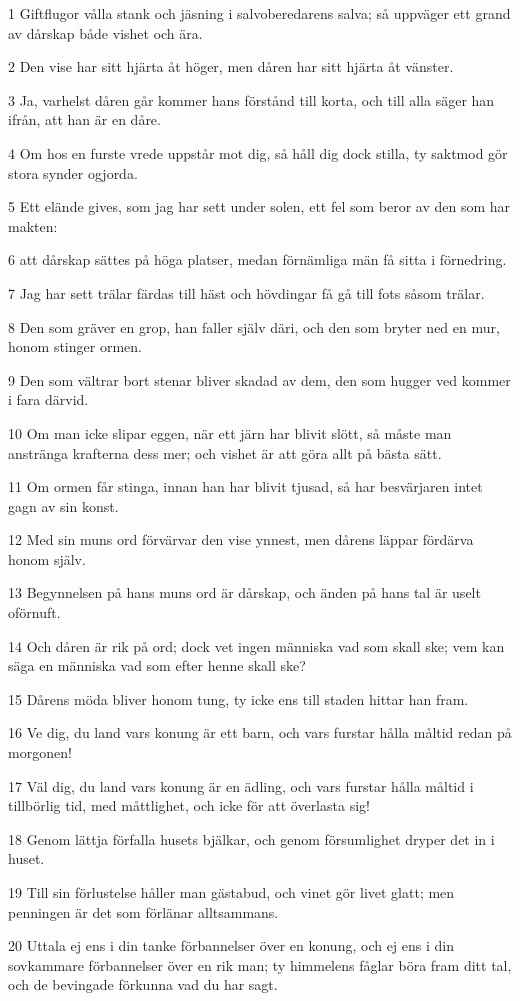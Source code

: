 \par 1 Giftflugor vålla stank och jäsning i salvoberedarens salva; så uppväger ett grand av dårskap både vishet och ära.
\par 2 Den vise har sitt hjärta åt höger, men dåren har sitt hjärta åt vänster.
\par 3 Ja, varhelst dåren går kommer hans förstånd till korta, och till alla säger han ifrån, att han är en dåre.
\par 4 Om hos en furste vrede uppstår mot dig, så håll dig dock stilla, ty saktmod gör stora synder ogjorda.
\par 5 Ett elände gives, som jag har sett under solen, ett fel som beror av den som har makten:
\par 6 att dårskap sättes på höga platser, medan förnämliga män få sitta i förnedring.
\par 7 Jag har sett trälar färdas till häst och hövdingar få gå till fots såsom trälar.
\par 8 Den som gräver en grop, han faller själv däri, och den som bryter ned en mur, honom stinger ormen.
\par 9 Den som vältrar bort stenar bliver skadad av dem, den som hugger ved kommer i fara därvid.
\par 10 Om man icke slipar eggen, när ett järn har blivit slött, så måste man anstränga krafterna dess mer; och vishet är att göra allt på bästa sätt.
\par 11 Om ormen får stinga, innan han har blivit tjusad, så har besvärjaren intet gagn av sin konst.
\par 12 Med sin muns ord förvärvar den vise ynnest, men dårens läppar fördärva honom själv.
\par 13 Begynnelsen på hans muns ord är dårskap, och änden på hans tal är uselt oförnuft.
\par 14 Och dåren är rik på ord; dock vet ingen människa vad som skall ske; vem kan säga en människa vad som efter henne skall ske?
\par 15 Dårens möda bliver honom tung, ty icke ens till staden hittar han fram.
\par 16 Ve dig, du land vars konung är ett barn, och vars furstar hålla måltid redan på morgonen!
\par 17 Väl dig, du land vars konung är en ädling, och vars furstar hålla måltid i tillbörlig tid, med måttlighet, och icke för att överlasta sig!
\par 18 Genom lättja förfalla husets bjälkar, och genom försumlighet dryper det in i huset.
\par 19 Till sin förlustelse håller man gästabud, och vinet gör livet glatt; men penningen är det som förlänar alltsammans.
\par 20 Uttala ej ens i din tanke förbannelser över en konung, och ej ens i din sovkammare förbannelser över en rik man; ty himmelens fåglar böra fram ditt tal, och de bevingade förkunna vad du har sagt.

